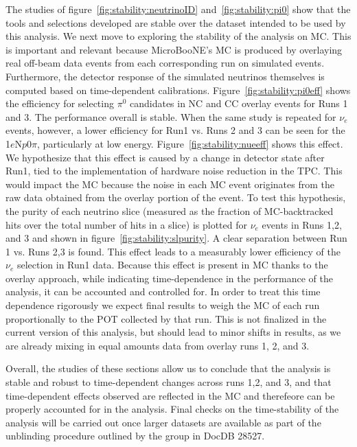 \documentclass[a4paper]{article}
\newcommand{\npsel}{1$e$N$p$0$\pi$\xspace}
\begin{document}
\par The studies of figure~\ref{fig:stability:neutrinoID} and~\ref{fig:stability:pi0} show that the tools and selections developed are stable over the dataset intended to be used by this analysis. We next move to exploring the stability of the analysis on MC. This is important and relevant because MicroBooNE's MC is produced by overlaying real off-beam data events from each corresponding run on simulated events. Furthermore, the detector response of the simulated neutrinos themselves is computed based on time-dependent calibrations. Figure~\ref{fig:stability:pi0eff} shows the efficiency for selecting $\pi^0$ candidates in NC and CC overlay events for Runs 1 and 3. The performance overall is stable. When the same study is repeated for $\nu_e$ events, however, a lower efficiency for Run1 vs. Runs 2 and 3 can be seen for the \npsel, particularly at low energy. Figure~\ref{fig:stability:nueeff} shows this effect. We hypothesize that this effect is caused by a change in detector state after Run1, tied to the implementation of hardware noise reduction in the TPC. This would impact the MC because the noise in each MC event originates from the raw data obtained from the overlay portion of the event. To test this hypothesis, the purity of each neutrino slice (measured as the fraction of MC-backtracked hits over the total number of hits in a slice) is plotted for $\nu_e$ events in Runs 1,2, and 3 and shown in figure~\ref{fig:stability:slpurity}. A clear separation between Run 1 vs. Runs 2,3 is found. This effect leads to a measurably lower efficiency of the $\nu_e$ selection in Run1 data. Because this effect is present in MC thanks to the overlay approach, while indicating time-dependence in the performance of the analysis, it can be accounted and controlled for. In order to treat this time dependence rigorously we expect final results to weigh the MC of each run proportionally to the POT collected by that run. This is not finalized in the current version of this analysis, but should lead to minor shifts in results, as we are already mixing in equal amounts data from overlay runs 1, 2, and 3.
\par Overall, the studies of these sections allow us to conclude that the analysis is stable and robust to time-dependent changes across runs 1,2, and 3, and that time-dependent effects observed are reflected in the MC and therefeore can be properly accounted for in the analysis. Final checks on the time-stability of the analysis will be carried out once larger datasets are available as part of the unblinding procedure outlined by the group in DocDB 28527. 
\end{document}
